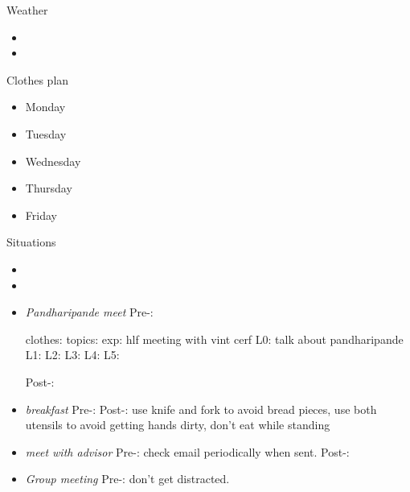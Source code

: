 \begin{frame}
\begin{columns}
\begin{column}{0.20\linewidth}
      \begin{block}{Weather} 
        \begin{itemize}
          \tiny \item \tiny 
        \item \tiny 
        \end{itemize}
      \end{block} 

      \begin{block}{Clothes plan} 
        \begin{itemize}
          \tiny \item \tiny Monday
        \item \tiny Tuesday 
        \item \tiny Wednesday
        \item \tiny Thursday
        \item \tiny Friday
        \end{itemize} 
      \end{block}
      
      \begin{block}{Situations}

        \begin{itemize} 

        \item \tiny \item 

          \tiny \item \tiny {} \textit{Pandharipande
            meet} Pre-: 

          clothes: 
          topics: exp: hlf meeting with vint cerf L0: talk about pandharipande  L1:    L2:     L3:  L4:   L5: 

           Post-: 
          
           \tiny \item \tiny \textit{breakfast} Pre-: Post-: use knife and
           fork to avoid bread pieces, use both utensils to avoid
           getting hands dirty, don't eat while standing 
          \tiny \item \tiny \textit{meet with advisor} Pre-: check
          email periodically when sent. Post-: 
        \item \tiny \textit{Group meeting} Pre-: don't get
          distracted. 
        \end{itemize} 

      \end{block}
      

\end{column}
\end{columns}
\end{frame}
